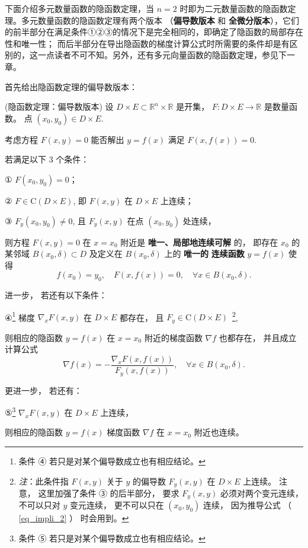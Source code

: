 下面介绍多元数量函数的隐函数定理，当 $n=2$ 时即为二元数量函数的隐函数定理。多元数量函数的隐函数定理有两个版本 （\textbf{偏导数版本} 和\textbf{ 全微分版本}），它们的前半部分在满足条件①②③的情况下是完全相同的，即确定了隐函数的局部存在性和唯一性； 而后半部分在导出隐函数的梯度计算公式时所需要的条件却是有区别的，这一点读者不可不知。另外，还有多元向量函数的隐函数定理，参见下一章。

首先给出隐函数定理的偏导数版本：

 \begin{theorem}{(隐函数定理：偏导数版本)}\label{the_impli_2}
 设 $D\times E\subset\mathbb{R}^{n}\times\mathbb{R}$ 是开集， $F:D\times E\rightarrow\mathbb{R}$
是数量函数。 点 $(x_{0},y_{0})\in D\times E.$ 

考虑方程 $F(x,y)=0$ 能否解出 $y=f(x)$ 满足 $F(x,f(x))=0.$ 

若满足以下 3 个条件：

① $F(x_{0},y_{0})=0$；

② $F\in\mathrm{C}(D\times E)$, 即 $F(x,y)$ 在 $D\times E$ 上连续； 

③ $F_{y}(x_{0},y_{0})\neq0$, 且 $F_{y}(x,y)$ 在点 $(x_0,y_0)$ 处连续，

则方程 $F(x,y)=0$ 在 $x=x_{0}$ 附近是\textbf{ 唯一、局部地连续可解} 的， 即存在 $x_{0}$
的某邻域 $B(x_{0},\delta)\subset D$ 及定义在 $B(x_{0},\delta)$ 上的 \textbf{唯一的} \textbf{
连续函数} $y=f(x)$ 使得
\[
f(x_{0})=y_{0},\quad F(x,f(x))=0,\quad\forall x\in B(x_{0},\delta).
\]

进一步， 若还有以下条件：

④\footnote{条件 ④ 若只是对某个偏导数成立也有相应结论。 } 梯度 $\nabla_{x}F(x,y)$ 在 $D\times E$
都存在， 且 $F_y\in\mathrm{C}(D\times E)$ $\,$\footnote{\textsl{注}：此条件指 $F(x,y)$ 关于 $y$ 的偏导数 $F_{y}(x,y)$
 在 $D\times E$ 上连续。 注意， 这里加强了条件 ③ 的后半部分， 要求 $F_{y}(x,y)$ 必须对两个变元连续， 不可以只对 $y$
 变元连续， 更不可以只在 $(x_0,y_0)$ 连续， 因为推导公式 （ \autoref{eq_impli_2} ） 时会用到。},

则相应的隐函数 $y=f(x)$ 在 $x=x_{0}$ 附近的梯度函数 $\nabla f$ 也都存在， 并且成立计算公式
\[
\nabla f(x)=-{\displaystyle \frac{\nabla_{x}F(x,f(x))}{F_{y}(x,f(x))}},\quad\forall x\in B(x_{0},\delta).
\]

更进一步， 若还有：

⑤\footnote{条件 ⑤ 若只是对某个偏导数成立也有相应结论。} $\nabla_{x}F(x,y)$ 在 $D\times E$
上连续， 

则相应的隐函数 $y=f(x)$ 梯度函数 $\nabla f$ 在 $x=x_{0}$ 附近也连续。


\end{theorem}
